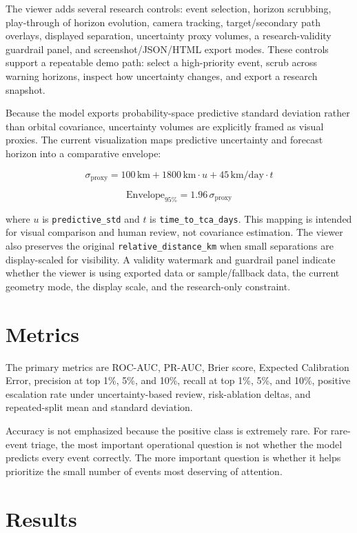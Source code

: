 \documentclass[11pt]{article}
\begin{document}
The viewer adds several research controls: event selection, horizon scrubbing, play-through of horizon evolution, camera tracking, target/secondary path overlays, displayed separation, uncertainty proxy volumes, a research-validity guardrail panel, and screenshot/JSON/HTML export modes. These controls support a repeatable demo path: select a high-priority event, scrub across warning horizons, inspect how uncertainty changes, and export a research snapshot.

Because the model exports probability-space predictive standard deviation rather than orbital covariance, uncertainty volumes are explicitly framed as visual proxies. The current visualization maps predictive uncertainty and forecast horizon into a comparative envelope:

\[
\sigma_{\mathrm{proxy}} = 100\,\mathrm{km} + 1800\,\mathrm{km}\cdot u + 45\,\mathrm{km/day}\cdot t
\]

\[
\mathrm{Envelope}_{95\%} = 1.96\,\sigma_{\mathrm{proxy}}
\]

where $u$ is \texttt{predictive\_std} and $t$ is \texttt{time\_to\_tca\_days}. This mapping is intended for visual comparison and human review, not covariance estimation. The viewer also preserves the original \texttt{relative\_distance\_km} when small separations are display-scaled for visibility. A validity watermark and guardrail panel indicate whether the viewer is using exported data or sample/fallback data, the current geometry mode, the display scale, and the research-only constraint.

\section{Metrics}

The primary metrics are ROC-AUC, PR-AUC, Brier score, Expected Calibration Error, precision at top 1\%, 5\%, and 10\%, recall at top 1\%, 5\%, and 10\%, positive escalation rate under uncertainty-based review, risk-ablation deltas, and repeated-split mean and standard deviation.

Accuracy is not emphasized because the positive class is extremely rare. For rare-event triage, the most important operational question is not whether the model predicts every event correctly. The more important question is whether it helps prioritize the small number of events most deserving of attention.

\section{Results}
\end{document}
